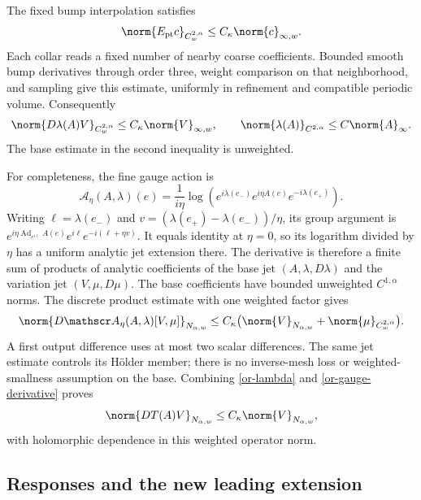 The fixed bump interpolation satisfies
\begin{equation}\label{or-point-weighted}
 \norm{E_{\rm pt}c}_{C^{2,\alpha}_w}
          \le C_\kappa\norm{c}_{\infty,w}.
\end{equation}
Each collar reads a fixed number of nearby coarse coefficients.
Bounded smooth bump derivatives through order three, weight
comparison on that neighborhood, and sampling give this estimate,
uniformly in refinement and compatible periodic volume.
Consequently
\begin{equation}\label{or-lambda}
 \norm{D\lambda(A)V}_{C^{2,\alpha}_w}
       \le C_\kappa\norm{V}_{\infty,w},\qquad
 \norm{\lambda(A)}_{C^{2,\alpha}}
       \le C\norm{A}_\infty.
\end{equation}
The base estimate in the second inequality is unweighted.

For completeness, the fine gauge action is
\[
 \mathscr A_\eta(A,\lambda)(e)=\frac1{i\eta}\log
 (e^{i\lambda(e_-)}e^{i\eta A(e)}e^{-i\lambda(e_+)}).
\]
Writing $\ell=\lambda(e_-)$ and
$v=(\lambda(e_+)-\lambda(e_-))/\eta$, its group argument is
$e^{i\eta\operatorname{Ad}_{e^{i\ell}}A(e)}
e^{i\ell}e^{-i(\ell+\eta v)}$.
It equals identity at $\eta=0$, so its logarithm divided by
$\eta$ has a uniform analytic jet extension there.
The derivative is therefore a finite sum of products of analytic
coefficients of the base jet $(A,\lambda,D\lambda)$ and the
variation jet $(V,\mu,D\mu)$. The base coefficients have bounded
unweighted $C^{1,\alpha}$ norms. The discrete product estimate
with one weighted factor gives
\begin{equation}\label{or-gauge-derivative}
 \norm{D\mathscr A_\eta(A,\lambda)[V,\mu]}_{N_{\alpha,w}}
 \le C_\kappa\bigl(\norm{V}_{N_{\alpha,w}}
                         +\norm{\mu}_{C^{2,\alpha}_w}\bigr).
\end{equation}
A first output difference uses at most two scalar differences.
The same jet estimate controls its H\"older member; there is no
inverse-mesh loss or weighted-smallness assumption on the base.
Combining \eqref{or-lambda} and \eqref{or-gauge-derivative} proves
\begin{equation}\label{or-DT}
 \norm{DT(A)V}_{N_{\alpha,w}}
                  \le C_\kappa\norm{V}_{N_{\alpha,w}},
\end{equation}
with holomorphic dependence in this weighted operator norm.

\subsection{Responses and the new leading extension}

